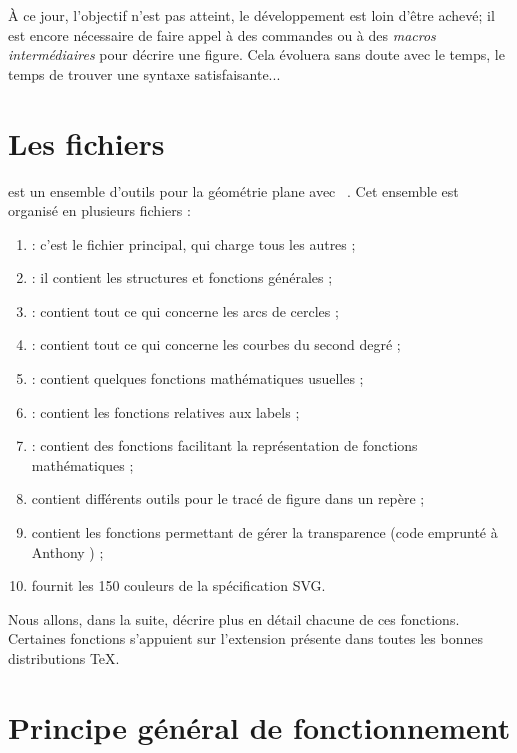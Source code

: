 \documentclass[a4paper,french]{article}
\begin{document}
\begin{Note} À ce jour, l'objectif n'est pas atteint, le
développement est loin d'être achevé; il est encore nécessaire de
faire appel à des commandes \MP{} ou à des \emph{macros
intermédiaires} pour décrire une figure. Cela évoluera sans doute
avec le temps, le temps de trouver une syntaxe satisfaisante...
\end{Note}


\section{Les fichiers}

\mpgeomdd est un ensemble d'outils pour la géométrie plane avec
\MP~\cite{ctan-metapost}. Cet 
ensemble est organisé en plusieurs fichiers :

\begin{enumerate}
\item {} : c'est le fichier principal, qui charge tous les
autres ;
\item {} : il contient
  les structures et fonctions générales ;
\item {} :
  contient tout ce qui concerne les arcs de cercles ;
\item {} :
  contient tout ce qui concerne les courbes du second degré ;
\item {} :
  contient quelques fonctions mathématiques usuelles ;
\item {} :
  contient les fonctions relatives aux labels ;
\item {} :
  contient des fonctions facilitant la représentation de fonctions
  mathématiques ;
\item {}
  contient différents outils pour le tracé de figure dans un repère ;
\item {}
  contient les fonctions permettant de gérer la transparence (code
  emprunté à Anthony ) ;
\item {} fournit les 150 couleurs de la spécification
SVG. 
\end{enumerate}

Nous allons, dans la suite, décrire plus en détail chacune de ces
fonctions. Certaines fonctions s'appuient sur
l'extension  présente dans toutes les bonnes
distributions \TeX.

\section{Principe général de fonctionnement}
\end{document}

